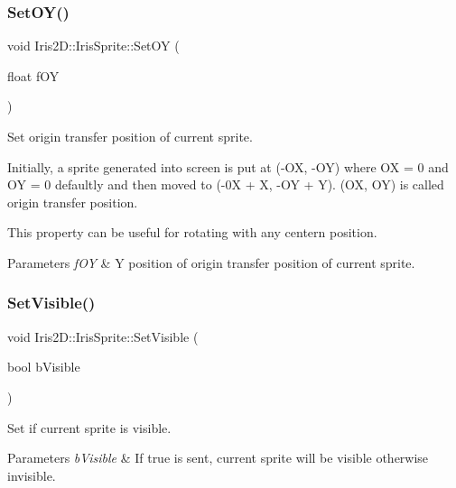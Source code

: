\subsubsection{\texorpdfstring{Set\+O\+Y()}{SetOY()}}
{\footnotesize\ttfamily void Iris2\+D\+::\+Iris\+Sprite\+::\+Set\+OY (\begin{DoxyParamCaption}\item[{float}]{f\+OY }\end{DoxyParamCaption})}



Set origin transfer position of current sprite. 

Initially, a sprite generated into screen is put at (-\/\+OX, -\/\+OY) where OX = 0 and OY = 0 defaultly and then moved to (-\/0X + X, -\/\+OY + Y). (OX, OY) is called origin transfer position.

This property can be useful for rotating with any centern position. 
\begin{DoxyParams}{Parameters}
{\em f\+OY} & Y position of origin transfer position of current sprite. \\
\hline
\end{DoxyParams}
\mbox{\label{class_iris2_d_1_1_iris_sprite_aae4592abf843276138b5805eb030575e}} 
\subsubsection{\texorpdfstring{Set\+Visible()}{SetVisible()}}
{\footnotesize\ttfamily void Iris2\+D\+::\+Iris\+Sprite\+::\+Set\+Visible (\begin{DoxyParamCaption}\item[{bool}]{b\+Visible }\end{DoxyParamCaption})}



Set if current sprite is visible. 


\begin{DoxyParams}{Parameters}
{\em b\+Visible} & If true is sent, current sprite will be visible otherwise invisible. \\
\hline
\end{DoxyParams}
\mbox{\label{class_iris2_d_1_1_iris_sprite_adfabb55dba020af9fe324d4abfa7f07a}} 
